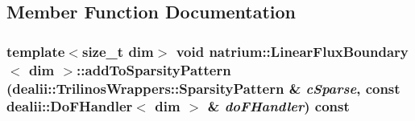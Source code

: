 \subsection{Member Function Documentation}
\hypertarget{classnatrium_1_1LinearFluxBoundary_a9af705258aaaa468de303848f622f9c0}{
\subsubsection[{addToSparsityPattern}]{\setlength{\rightskip}{0pt plus 5cm}template$<$size\_\-t dim$>$ void {\bf natrium::LinearFluxBoundary}$<$ dim $>$::addToSparsityPattern (dealii::TrilinosWrappers::SparsityPattern \& {\em cSparse}, \/  const dealii::DoFHandler$<$ dim $>$ \& {\em doFHandler}) const}}
\label{classnatrium_1_1LinearFluxBoundary_a9af705258aaaa468de303848f622f9c0}


